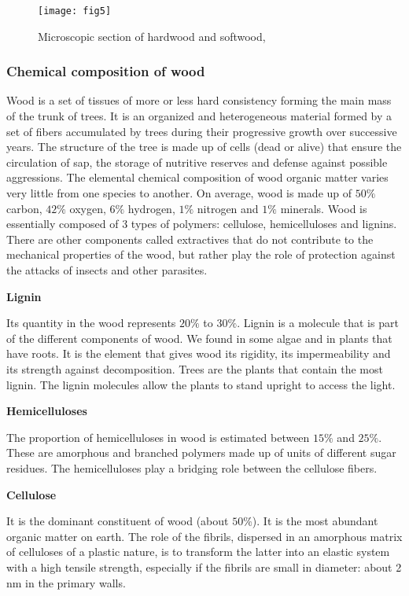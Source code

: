 \begin{figure}[htp]
	\centering
	\texttt{[image: fig5]}
	\caption{Microscopic section of hardwood and softwood, \cite{B.Thibaut}}
	\label{fig:fig5}
\end{figure}

\subsubsection{Chemical composition of wood}

Wood is a set of tissues of more or less hard consistency forming the main mass of the trunk of trees. It is an organized and heterogeneous material formed by a set of fibers accumulated by trees during their progressive growth over successive years. The structure of the tree is made up of cells (dead or alive) that ensure the circulation of sap, the storage of nutritive reserves and defense against possible aggressions.
The elemental chemical composition of wood organic matter varies very little from one species to another. On average, wood is made up of $50 \%$ carbon, $42 \%$ oxygen, $6 \%$ hydrogen, $1 \%$ nitrogen and $1 \%$ minerals. Wood is essentially composed of 3 types of polymers: cellulose, hemicelluloses and lignins. There are other components called extractives that do not contribute to the mechanical properties of the wood, but rather play the role of protection against the attacks of insects and other parasites.

\smallskip

\textbf{Lignin}

Its quantity in the wood represents $20 \%$ to $30 \%$. Lignin is a molecule that is part of the different components of wood. We found in some algae and in plants that have roots. It is the element that gives wood its rigidity, its impermeability and its strength against decomposition. Trees are the plants that contain the most lignin. The lignin molecules allow the plants to stand upright to access the light.

\smallskip

\textbf{Hemicelluloses}

The proportion of hemicelluloses in wood is estimated between $15 \%$ and $25 \%$. These are amorphous and branched polymers made up of units of different sugar residues. The hemicelluloses play a bridging role between the cellulose fibers.

\smallskip

\textbf{Cellulose}

It is the dominant constituent of wood (about $50 \%$). It is the most abundant organic matter on earth. The role of the fibrils, dispersed in an amorphous matrix of celluloses of a plastic nature, is to transform the latter into an elastic system with a high tensile strength, especially if the fibrils are small in diameter: about 2 nm in the primary walls.

